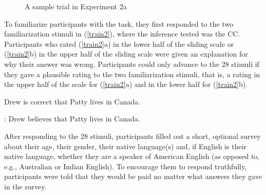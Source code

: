 \documentclass[11pt,fleqn]{article}
\newcommand{\6}{\mbox{$[\hspace*{-.6mm}[$}}
\newcommand{\9}{\mbox{$]\hspace*{-.6mm}]$}}
\begin{document}
\begin{figure}[H]
\begin{center}
\end{center}
\caption{A sample trial in Experiment 2a}\label{f-trial-exp3}
\end{figure}

To familiarize participants with the task, they first responded to the two familiarization stimuli in (\ref{train2}), where the inference tested was the CC. Participants who rated (\ref{train2}a) in the lower half of the sliding scale or (\ref{train2}b) in the upper half of the sliding scale were given an explanation for why their answer was wrong. Participants could only advance to the 28 stimuli if they gave a plausible rating to the two familiarization stimuli, that is, a rating in the upper half of the scale for (\ref{train2}a) and in the lower half for (\ref{train2}b).

\begin{exe}
\ex\label{train2}
\begin{xlist}
 Drew is correct that Patty lives in Canada. 

: Drew believes that Patty lives in Canada.
\end{xlist}
\end{exe}

After responding to the 28 stimuli, participants filled out a short, optional survey about their age, their gender, their native language(s) and, if English is their native language, whether they are a speaker of American English (as opposed to, e.g., Australian or Indian English). To encourage them to respond truthfully, participants were told that they would be paid no matter what answers they gave in the survey.
\end{document}

